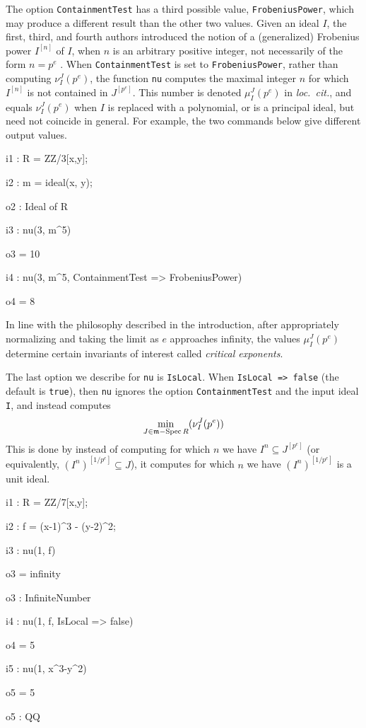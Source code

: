 \documentclass{amsart}
\begin{document}

The option {\tt ContainmentTest} has a third possible value, {\tt FrobeniusPower}, which may produce a different result than the other two values.
Given an ideal $I$, the first, third, and fourth authors introduced the notion of a (generalized) Frobenius power $I^{[n]}$ of $I$, when $n$ is an arbitrary positive integer, not necessarily of the form $n = p^e$ \cite{hernandez+etal.frobenius_powers}.
When {\tt ContainmentTest} is set to {\tt FrobeniusPower}, rather than  computing $\nu_I^J(p^e)$, the function {\tt nu} computes the
maximal integer $n$ for which $I^{[n]}$ is not contained in $J^{[p^e]}$.  This number is denoted $\mu_I^J(p^e)$ in \emph{loc.\ cit.}, and equals $\nu_I^J(p^e)$ when $I$ is replaced with a polynomial, or is a principal ideal, but need not coincide in general.
For example, the two commands below give different output values.

{\small
{}
\begin{MyVerbatim}

i1 : R = ZZ/3[x,y];

i2 : m = ideal(x, y);

o2 : Ideal of R

i3 : nu(3, m^5)

o3 = 10

i4 : nu(3, m^5, ContainmentTest => FrobeniusPower)

o4 = 8
\end{MyVerbatim}
}

\medspace
\noindent In line with the philosophy described in the introduction, after appropriately normalizing and taking the limit as $e$ approaches infinity, the values $\mu_I^J(p^e)$ determine certain invariants of interest called \emph{critical exponents}.

The last option we describe for {\tt nu} is {\tt IsLocal}.  When {\tt IsLocal => false} (the default is {\tt true}), then {\tt nu} ignores the option {\tt ContainmentTest} and the input ideal {\tt I}, and instead computes
\[
\min_{J \in \mathfrak{m}-\operatorname{{Spec}} R} (\nu_I^J(p^e))
\]
This is done by instead of computing for which $n$ we have $I^{n} \subseteq J^{[p^e]}$ (or equivalently, $(I^n)^{[1/p^e]} \subseteq J$), it computes for which $n$ we have $(I^n)^{[1/p^e]}$ is a unit ideal.

{\small
{}
\begin{MyVerbatim}
    i1 : R = ZZ/7[x,y];

    i2 : f = (x-1)^3 - (y-2)^2;

    i3 : nu(1, f)

    o3 = infinity

    o3 : InfiniteNumber

    i4 : nu(1, f, IsLocal => false)

    o4 = 5

    i5 : nu(1, x^3-y^2)

    o5 = 5

    o5 : QQ
\end{MyVerbatim}
}
\end{document}
